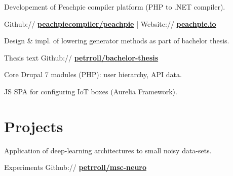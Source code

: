 \documentclass[a4paper]{deedy-resume} %
\begin{document}
\begin{minipage}[t]{0.62\textwidth}

\begin{tightitemize}
\item Developement of Peachpie compiler platform (PHP to .NET compiler).
\item Github:// \href{https://github.com/peachpiecompiler/peachpie}{\bf peachpiecompiler/peachpie} | Website:// \href{https://www.peachpie.io/}{\bf peachpie.io}
\item Design \& impl. of lowering generator methods as part of bachelor thesis.
\item Thesis text Github:// \href{https://github.com/petrroll/bachelor-thesis}{\bf petrroll/bachelor-thesis}
\end{tightitemize}

\sectionspace %



\begin{tightitemize}
\item Core Drupal 7 modules (PHP): user hierarchy, API data.
\item JS SPA for configuring IoT boxes (Aurelia Framework).
\end{tightitemize}

\sectionspace %

\section{Projects}


\emptyLocation %
\begin{tightitemize}
\item Application of deep-learning architectures to small noisy data-sets.
\item Experiments Github:// \href{https://github.com/petrroll/msc-neuro}{\bf petrroll/msc-neuro}
\end{tightitemize}


\end{minipage}
\end{document}
